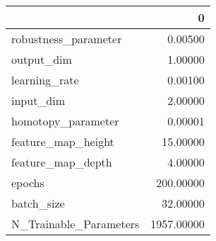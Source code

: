 \begin{tabular}{lr}
\toprule
{} &           0 \\
\midrule
robustness\_parameter   &     0.00500 \\
output\_dim             &     1.00000 \\
learning\_rate          &     0.00100 \\
input\_dim              &     2.00000 \\
homotopy\_parameter     &     0.00001 \\
feature\_map\_height     &    15.00000 \\
feature\_map\_depth      &     4.00000 \\
epochs                 &   200.00000 \\
batch\_size             &    32.00000 \\
N\_Trainable\_Parameters &  1957.00000 \\
\bottomrule
\end{tabular}
